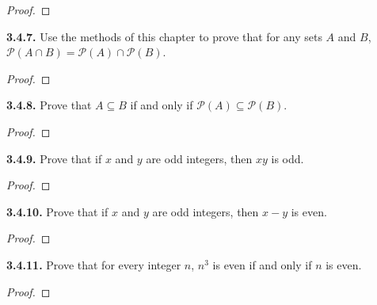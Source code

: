 \documentclass[12pt]{amsart}
\newenvironment{statement}[1]{\smallskip\noindent\color[rgb]{.6627, .3529, .6314} {\bf #1.}}{}
\theoremstyle{definition}
\theoremstyle{remark}
\newcommand{\powerset}[1]{\mathscr{P} \left( #1 \right)}
\begin{document}
\begin{proof}
\end{proof}


\begin{statement}{3.4.7}
Use the methods of this chapter to prove that for any sets $A$ and $B$, $\powerset{A \cap B} = \powerset{A} \cap \powerset{B}$.
\end{statement}

\begin{proof}
\end{proof}


\begin{statement}{3.4.8}
Prove that $A \subseteq B$ if and only if $\powerset{A} \subseteq \powerset{B}$.
\end{statement}

\begin{proof}
\end{proof}


\begin{statement}{3.4.9}
Prove that if $x$ and $y$ are odd integers, then $xy$ is odd.
\end{statement}

\begin{proof}
\end{proof}


\begin{statement}{3.4.10}
Prove that if $x$ and $y$ are odd integers, then $x - y$ is even.
\end{statement}

\begin{proof}
\end{proof}


\begin{statement}{3.4.11}
Prove that for every integer $n$, $n^3$ is even if and only if $n$ is even.
\end{statement}

\begin{proof}
\end{proof}
\end{document}
